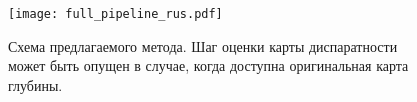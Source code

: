\begin{figure}[!h]
	\begin{minipage}[b]{1.0\linewidth}
		\centering
		\centerline{ \texttt{[image: full\_pipeline\_rus.pdf]} }
	\end{minipage}
    \caption{ Схема предлагаемого метода. Шаг оценки карты диспаратности 
    	может быть опущен в случае, когда доступна оригинальная карта глубины. }
	\label{fig:full}
\end{figure}
